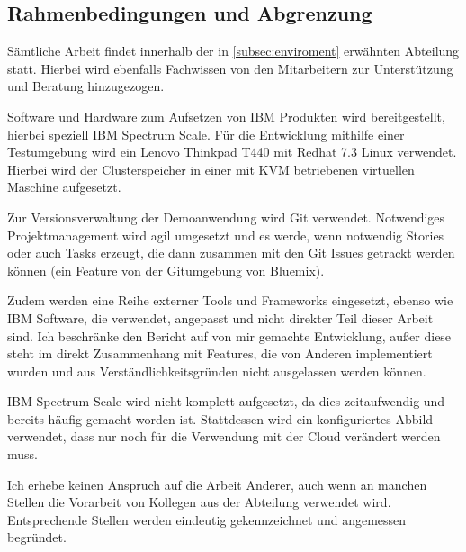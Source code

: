 \subsection{Rahmenbedingungen und Abgrenzung}

Sämtliche Arbeit findet innerhalb der in \autoref{subsec:enviroment} erwähnten Abteilung statt. Hierbei wird ebenfalls Fachwissen von den Mitarbeitern zur Unterstützung und Beratung hinzugezogen.

Software und Hardware zum Aufsetzen von IBM Produkten wird bereitgestellt, hierbei speziell IBM Spectrum Scale. Für die Entwicklung mithilfe einer Testumgebung wird ein Lenovo Thinkpad T440 mit Redhat 7.3 Linux verwendet. Hierbei wird der Clusterspeicher in einer mit KVM betriebenen virtuellen Maschine aufgesetzt.

Zur Versionsverwaltung der Demoanwendung wird \gls{Git} verwendet. Notwendiges Projektmanagement wird agil umgesetzt und es werde, wenn notwendig Stories oder auch Tasks erzeugt, die dann zusammen mit den Git Issues getrackt werden können (ein Feature von der Gitumgebung von Bluemix).

Zudem werden eine Reihe externer Tools und Frameworks eingesetzt, ebenso wie IBM Software, die verwendet, angepasst und nicht direkter Teil dieser Arbeit sind. Ich beschränke den Bericht auf von mir gemachte Entwicklung, außer diese steht im direkt Zusammenhang mit Features, die von Anderen implementiert wurden und aus Verständlichkeitsgründen nicht ausgelassen werden können.

IBM Spectrum Scale wird nicht komplett aufgesetzt, da dies zeitaufwendig und bereits häufig gemacht worden ist. Stattdessen wird ein konfiguriertes Abbild verwendet, dass nur noch für die Verwendung mit der Cloud verändert werden muss.

Ich erhebe keinen Anspruch auf die Arbeit Anderer, auch wenn an manchen Stellen die Vorarbeit von Kollegen aus der Abteilung verwendet wird. Entsprechende Stellen werden eindeutig gekennzeichnet und angemessen begründet.